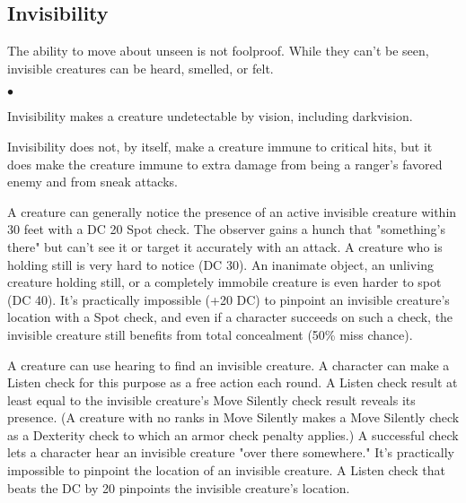 \subsection{Invisibility}

The ability to move about unseen is not foolproof. While they can't be seen, invisible creatures can be heard, smelled, or felt. 

\begin{list}{$\bullet$}{\itemspace}
	\item Invisibility makes a creature undetectable by vision, including darkvision.
	\item Invisibility does not, by itself, make a creature immune to critical hits, but it does make the creature immune to extra damage from being a ranger's favored enemy and from sneak attacks.
	\item A creature can generally notice the presence of an active invisible creature within 30 feet with a DC 20 Spot check. The observer gains a hunch that "something's there" but can't see it or target it accurately with an attack. A creature who is holding still is very hard to notice (DC 30). An inanimate object, an unliving creature holding still, or a completely immobile creature is even harder to spot (DC 40). It's practically impossible (+20 DC) to pinpoint an invisible creature's location with a Spot check, and even if a character succeeds on such a check, the invisible creature still benefits from total concealment (50\% miss chance).
	\item A creature can use hearing to find an invisible creature. A character can make a Listen check for this purpose as a free action each round. A Listen check result at least equal to the invisible creature's Move Silently check result reveals its presence. (A creature with no ranks in Move Silently makes a Move Silently check as a Dexterity check to which an armor check penalty applies.) A successful check lets a character hear an invisible creature "over there somewhere." It's practically impossible to pinpoint the location of an invisible creature. A Listen check that beats the DC by 20 pinpoints the invisible creature's location.


\end{list}
